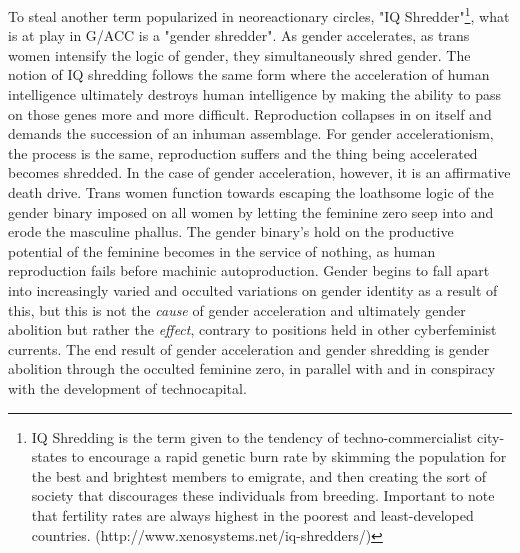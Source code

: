\documentclass[12pt, a5paper, twoside, openright]{memoir}
\begin{document}
To steal another term popularized in neoreactionary circles, "IQ Shredder"\footnote{IQ Shredding is the term given to the tendency of techno-commercialist city-states to encourage a rapid genetic burn rate by skimming the population for the best and brightest members to emigrate, and then creating the sort of society that discourages these individuals from breeding. Important to note that fertility rates are always highest in the poorest and least-developed countries. (http://www.xenosystems.net/iq-shredders/)}, what is at play in G/ACC is a "gender shredder". As gender accelerates, as trans women intensify the logic of gender, they simultaneously shred gender. The notion of IQ shredding follows the same form where the acceleration of human intelligence ultimately destroys human intelligence by making the ability to pass on those genes more and more difficult. Reproduction collapses in on itself and demands the succession of an inhuman assemblage. For gender accelerationism, the process is the same, reproduction suffers and the thing being accelerated becomes shredded. In the case of gender acceleration, however, it is an affirmative death drive. Trans women function towards escaping the loathsome logic of the gender binary imposed on all women by letting the feminine zero seep into and erode the masculine phallus. The gender binary's hold on the productive potential of the feminine becomes in the service of nothing, as human reproduction fails before machinic autoproduction. Gender begins to fall apart into increasingly varied and occulted variations on gender identity as a result of this, but this is not the \emph{cause} of gender acceleration and ultimately gender abolition but rather the \emph{effect}, contrary to positions held in other cyberfeminist currents. The end result of gender acceleration and gender shredding is gender abolition through the occulted feminine zero, in parallel with and in conspiracy with the development of technocapital.
\end{document}
